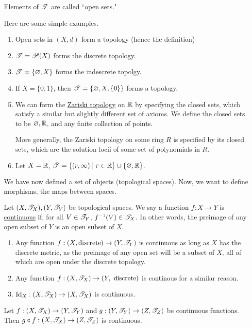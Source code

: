 \documentclass[x11names,reqno,14pt]{extarticle}
\newcommand*{\oo}{{\infty}}
\begin{document}
Elements of $\mathscr{T}$ are called ``open sets." 

\exm Here are some simple examples. 


\begin{enumerate}
\item Open sets in $(X, d)$ form a topology (hence the definition)
\item $\mathscr{T} = \mathscr{P}(X)$ forms the discrete topology. 
\item $\mathscr{T} = \{\varnothing, X\}$ forms the indescrete topolgy.
\item If $X = \{0, 1\}$, then $\mathscr{T} = \{\varnothing, X, \{0\}\}$ forms a topology. 
\item We can form the \underline{Zariski topology} on $\mathbb{R}$ by specifying the closed sets, which satisfy a similar but slightly different set of axioms. We define the closed sets to be $\varnothing, \mathbb{R}$, and any finite collection of points. 

More generally, the Zariski topology on some ring $R$ is specified by its closed sets, which are the solution locii of some set of polynomials in $R$. 
\item Let $X = \mathbb{R}$, $\ms{T} = \{(r, \oo)\mid r\in\R\} \cup \{\varnothing, \R\}$. 
\end{enumerate}

We have now defined a set of objects (topological spaces). Now, we want to define morphisms, the maps between spaces. 

 Let $(X, \mathscr{T}_X), (Y, \mathscr{T}_Y)$ be topological spaces. We say a function $f:X\to Y$ is \underline{continuous} if, for all $V\in\mathscr{T}_Y$, $f^{-1}(V) \in \mathscr{T}_X$. In other words, the preimage of any open subset of $Y$ is an open subset of $X$. 

\exm

\begin{enumerate} Some baby examples
\item Any function $f:(X, \text{discrete})\to (Y, \mathscr{T}_Y)$ is continuous as long as $X$ has the discrete metric, as the preimage of any open set will be a subset of $X$, all of which are open under the discrete topology. 
\item Any function $f:(X,\mathscr{T}_X)\to(Y,\text{ discrete})$ is continous for a similar reason. 
\item $\operatorname{\mathrm{Id}}_X:(X, \mathscr{T}_X)\to(X,\mathscr{T}_X)$ is continuous. 
\end{enumerate}

\thm 

Let $f:(X,\mathscr{T}_X)\to(Y,\mathscr{T}_Y)$ and $g:(Y,\mathscr{T}_Y)\to(Z,\mathscr{T}_Z)$ be continuous functions. Then $g \circ f:(X,\mathscr{T}_X)\to(Z,\mathscr{T}_Z)$ is continuous. 
\end{document}
